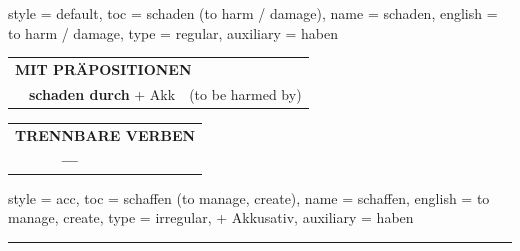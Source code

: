 \begin{verbentry}{
  style = {default},
  toc = {schaden (to harm / damage)},
  name = {schaden},
  english = {to harm / damage},
  type = {regular},
  auxiliary = {haben}
}
\vspace{10pt}

\begin{tabular}{lll}
\multicolumn{3}{l}{\textbf{MIT PRÄPOSITIONEN}}\\
& \textbf{schaden durch} + Akk & (to be harmed by)\\
\end{tabular}
\hfill
\begin{tabular}{lll}
\multicolumn{3}{l}{\textbf{TRENNBARE VERBEN}}\\
& \textbf{---} & \\
\end{tabular}
\vspace{-5pt}
\end{verbentry}

\begin{verbentry}{
  style = {acc},
  toc = {schaffen (to manage, create)},
  name = {schaffen},
  english = {to manage, create},
  type = {irregular, + Akkusativ},
  auxiliary = {haben}
}
 
    
     \vspace{5pt}

    \hrule
    
    \vspace{5pt}


\end{verbentry}
